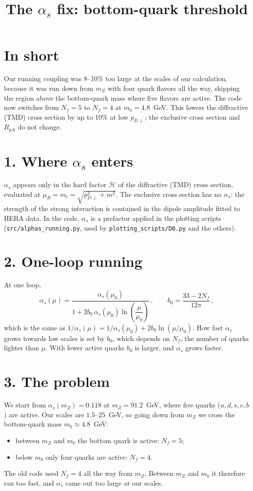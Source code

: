 \documentclass[12pt]{article}
\title{The $\alpha_s$ fix: bottom-quark threshold}
\author{}
\date{}
\begin{document}
\maketitle

\section*{In short}

Our running coupling was 8--10\% too large at the scales of our calculation, because it was
run down from $m_Z$ with four quark flavors all the way, skipping the region above the bottom-quark
mass where five flavors are active. The code now switches from $N_f=5$ to $N_f=4$ at
$m_b=4.8$~GeV. This lowers the diffractive (TMD) cross section by up to 10\% at low $p_{D\perp}$;
the exclusive cross section and $R_{pA}$ do not change.

\section*{1. Where $\alpha_s$ enters}

$\alpha_s$ appears only in the hard factor $\mathcal{H}$ of the diffractive (TMD) cross section,
evaluated at $\mu_R=m_t=\sqrt{p_{D\perp}^2+m^2}$. The exclusive cross section has no $\alpha_s$:
the strength of the strong interaction is contained in the dipole amplitude fitted to HERA data.
In the code, $\alpha_s$ is a prefactor applied in the plotting scripts
(\texttt{src/alphas\_running.py}, used by \texttt{plotting\_scripts/D0.py} and the others).

\section*{2. One-loop running}

At one loop,
\[
  \alpha_s(\mu)=\frac{\alpha_s(\mu_0)}{1+2b_0\,\alpha_s(\mu_0)\ln\left(\dfrac{\mu}{\mu_0}\right)}\,,\qquad
  b_0=\frac{33-2N_f}{12\pi}\,,
\]
which is the same as $1/\alpha_s(\mu)=1/\alpha_s(\mu_0)+2b_0\ln(\mu/\mu_0)$.
How fast $\alpha_s$ grows towards low scales is set by $b_0$, which depends on $N_f$, the number of
quarks lighter than $\mu$. With fewer active quarks $b_0$ is larger, and $\alpha_s$ grows faster.

\section*{3. The problem}

We start from $\alpha_s(m_Z)=0.118$ at $m_Z=91.2$~GeV, where five quarks ($u,d,s,c,b$) are active.
Our scales are $1.5$--$25$~GeV, so going down from $m_Z$ we cross the bottom-quark mass
$m_b\approx4.8$~GeV:
\begin{itemize}
\item between $m_Z$ and $m_b$ the bottom quark is active: $N_f=5$;
\item below $m_b$ only four quarks are active: $N_f=4$.
\end{itemize}
The old code used $N_f=4$ all the way from $m_Z$. Between $m_Z$ and $m_b$ it therefore ran too fast,
and $\alpha_s$ came out too large at our scales.
\end{document}
